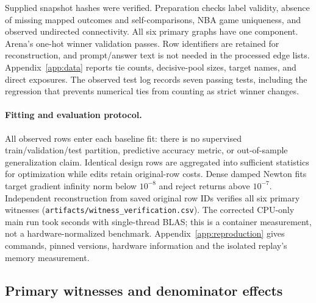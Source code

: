 \documentclass{article}
\begin{document}
Supplied snapshot hashes were verified. Preparation checks label validity, absence of missing mapped outcomes and self-comparisons, NBA game uniqueness, and observed undirected connectivity. All six primary graphs have one component. Arena's one-hot winner validation passes. Row identifiers are retained for reconstruction, and prompt/answer text is not needed in the processed edge lists. Appendix~\ref{app:data} reports tie counts, decisive-pool sizes, target names, and direct exposures. The observed test log records seven passing tests, including the regression that prevents numerical ties from counting as strict winner changes.

\paragraph{Fitting and evaluation protocol.}
All observed rows enter each baseline fit: there is no supervised train/validation/test partition, predictive accuracy metric, or out-of-sample generalization claim. Identical design rows are aggregated into sufficient statistics for optimization while edits retain original-row costs. Dense damped Newton fits target gradient infinity norm below $10^{-8}$ and reject returns above $10^{-7}$. Independent reconstruction from saved original row IDs verifies all six primary witnesses (\texttt{artifacts/witness\_verification.csv}). The corrected CPU-only main run took \MainSeconds{} seconds with single-thread BLAS; this is a container measurement, not a hardware-normalized benchmark. Appendix~\ref{app:reproduction} gives commands, pinned versions, hardware information and the isolated replay's memory measurement.

\subsection{Primary witnesses and denominator effects}
\label{sec:primary}
\begin{table}[t]
\centering
\caption{Primary fixed-schedule witnesses under sum-loss ridge BT ($\lambda=1$). $M$ is the participant count, $E_{ab}$ includes ties, and $\hat\Delta$ is the original leader--runner-up gap. Percentages use all rows or target-union exposure, not only decisive rows. Every $k$ is refit-verified, entirely target-incident, and an upper bound on the unknown minimum, not a certified minimum. Generated input: \texttt{paper/tables/main.tex}.}
\label{tab:main}
{\small\setlength{\tabcolsep}{4pt}}
\end{table}
\end{document}
